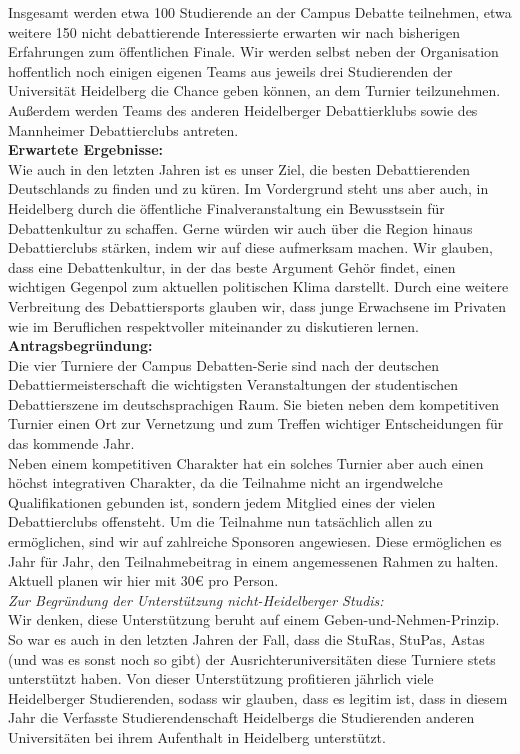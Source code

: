{    Insgesamt werden etwa 100 Studierende an der Campus Debatte teilnehmen, etwa weitere 150 nicht debattierende Interessierte erwarten wir nach bisherigen Erfahrungen zum öffentlichen Finale. Wir werden selbst neben der Organisation hoffentlich noch einigen eigenen Teams aus jeweils drei Studierenden der Universität Heidelberg die Chance geben können, an dem Turnier teilzunehmen.\\
    Außerdem werden Teams des anderen Heidelberger Debattierklubs sowie des Mannheimer Debattierclubs antreten.\\[1em]
    \textbf{Erwartete Ergebnisse:}\\
    Wie auch in den letzten Jahren ist es unser Ziel, die besten Debattierenden Deutschlands zu finden und zu küren. Im Vordergrund steht uns aber auch, in Heidelberg durch die öffentliche Finalveranstaltung ein Bewusstsein für Debattenkultur zu schaffen. Gerne würden wir auch über die Region hinaus Debattierclubs stärken, indem wir auf diese aufmerksam machen. Wir glauben, dass eine Debattenkultur, in der das beste Argument Gehör findet, einen wichtigen Gegenpol zum aktuellen politischen Klima darstellt. Durch eine weitere Verbreitung des Debattiersports glauben wir, dass junge Erwachsene im Privaten wie im Beruflichen respektvoller miteinander zu diskutieren lernen.\\[1em]
    \textbf{Antragsbegründung:}\\
    Die vier Turniere der Campus Debatten-Serie sind nach der deutschen Debattiermeisterschaft die wichtigsten Veranstaltungen der studentischen Debattierszene im deutschsprachigen Raum. Sie bieten neben dem kompetitiven Turnier einen Ort zur Vernetzung und zum Treffen wichtiger Entscheidungen für das kommende Jahr.\\
    Neben einem kompetitiven Charakter hat ein solches Turnier aber auch einen höchst integrativen Charakter, da die Teilnahme nicht an irgendwelche Qualifikationen gebunden ist, sondern jedem Mitglied eines der vielen Debattierclubs offensteht. Um die Teilnahme nun tatsächlich allen zu ermöglichen, sind wir auf zahlreiche Sponsoren angewiesen. Diese ermöglichen es Jahr für Jahr, den Teilnahmebeitrag in einem angemessenen Rahmen zu halten. Aktuell planen wir hier mit 30€ pro Person.\\[1em]
    \emph{Zur Begründung der Unterstützung nicht-Heidelberger Studis:}\\
    Wir denken, diese Unterstützung beruht auf einem Geben-und-Nehmen-Prinzip. So war es auch in den letzten Jahren der Fall, dass die StuRas, StuPas, Astas (und was es sonst noch so gibt) der Ausrichteruniversitäten diese Turniere stets unterstützt haben. Von dieser Unterstützung profitieren jährlich viele Heidelberger Studierenden, sodass wir glauben, dass es legitim ist, dass in diesem Jahr die Verfasste Studierendenschaft Heidelbergs die Studierenden anderen Universitäten bei ihrem Aufenthalt in Heidelberg unterstützt.\\[1em]
}

